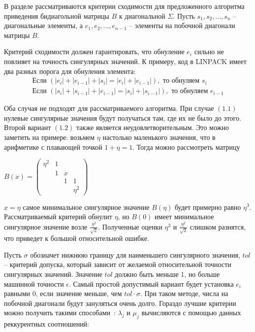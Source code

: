 
В разделе рассматриваются критерии сходимости для предложенного алгоритма приведения бидиагольной матрицы $B$ к диагональной $\Sigma$. Пусть $s_1, s_2,...,s_n$ \--- диагональные элементы, а $e_1, e_2, ..., e_{n-1}$ \--- элементы на побочной диагонали матрицы $B$. 

Критерий сходимости должен гарантировать, что обнуление $e_i$ сильно не повлияет на точность сингулярных значений. К примеру, код в LINPACK имеет два разных порога для обнуления элемента:
\begin{align}
\text{Если } (|e_i| + |e_{i-1}| + |s_i| = |e_i| + |e_{i-1}|), \text{ то обнуляем }s_i
\\\text{Если } (|s_i| + |s_{i-1}| + |e_{i-1}| = |s_i| + |s_{i-1}|), \text{ то обнуляем }e_{i-1}
\end{align}

Оба случая не подходят для рассматриваемого алгоритма. При случае $(1.1)$ нулевые сингулярные значения будут получаться там, где их не было до этого. Второй вариант $(1.2)$ также является неудовлетворительным. Это можно заметить на примере: возьмем $\eta$ настолько маленького значения, что в арифметике с плавающей точкой $1+\eta=1$. Тогда можно рассмотреть матрицу
\begin{center}
$B(x)=\begin{pmatrix}
    \eta^2&1&&\\
    &1&x\\
    &&1&1\\
    &&&\eta^2
\end{pmatrix}$
\end{center}

 $x=\eta$ самое минимальное сингулярное значение $B(\eta)$ будет примерно равно $\eta^3$. Рассматриваемый критерий обнулит $\eta$, но $B(0)$ имеет минимальное сингулярное значение возле $\frac{\eta^2}{\sqrt{2}}$. Полученные оценки $\eta^3$ и $\frac{\eta^2}{\sqrt{2}}$ слишком разнятся, что приведет к большой относительной ошибке.

Пусть $\sigma$ обозначет нижнюю границу для наименьшего сингулярного значения, $tol$ \--- критерий допуска, который зависит от желаемой относительной точности сингулярных значений. Значение $tol$ должно быть меньше 1, но больше машинной точности $\epsilon$. Самый простой допустимый вариант будет установка $e_i$ равными 0, если значение меньше, чем $tol\cdot\sigma$. При таком методе, числа на побочной диагонали будут зануляться очень долго. Гораздо лучшие критерии можно получить такими способами~\cite{Demmel1990}:
 $\lambda_j$ и $\mu_j$ вычисляются с помощью данных реккурентных соотношений:

